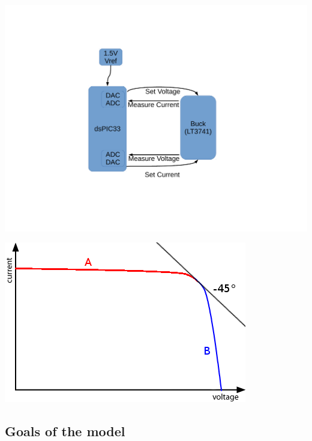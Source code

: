 \begin{minipage}{0.5\textwidth}
    \center
    \includegraphics[width=\textwidth,trim=140 140 120 100,clip]{images/block-diag-control.pdf}
    \label{fig:diag:block}
\end{minipage}
\begin{minipage}{0.5\textwidth}
    \center
    \includegraphics[width=\textwidth]{images/vi-curve.png}
    \label{fig:circuit:buck:uset}
\end{minipage}


\subsection{Goals of the model}

